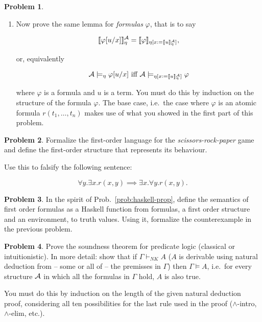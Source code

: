 \documentclass[a4paper]{article}
\theoremstyle{definition}
\newtheorem{prob}{Problem}
\newcommand{\mea}{\llbracket}
\newcommand{\ning}{\rrbracket}
\newcommand{\me}[1]{\mea{#1}\ning}
\begin{document}
\begin{prob}
\begin{enumerate}
\item Now prove the same lemma for {\em formulas} $\varphi$,
      that is to say

      \[\semeta{\varphi[u/x]} = \me{\varphi}_{\eta[x:=\semeta{u}]},\] 

      or, equivalently

      \[ {\cal A} \models_{\eta} \varphi[u/x] \mbox{ iff }
         {\cal A} \models_{\eta[x:=\semeta{u}]} \varphi \]

      where $\varphi$ is a formula and $u$ is a term. You must do this by
      induction on the structure of the formula $\varphi$. The base case,
      i.e.~the case where $\varphi$ is an atomic formula
      $r(t_1,\ldots,t_n)$ makes use of what you showed in the first part
      of this problem. 

\end{enumerate}
\end{prob}


\begin{prob}
Formalize the first-order language for the \emph{scissors-rock-paper}
game and define the first-order structure that represents its
behaviour. 

Use this to falsify the following sentence:

\[ \forall y. \exists x. r(x, y) \implies 
   \exists x. \forall y. r(x, y) . \]
\end{prob}


\begin{prob}
In the spirit of Prob.~{\ref{prob:haskell-prop}}, define the semantics
of first order formulas as a Haskell function from formulas, a first
order structure and an environment, to truth values. Using it,
formalize the counterexample in the previous problem.
\end{prob}


\begin{prob}
Prove the soundness theorem for predicate logic (classical or
intuitionistic). In more detail: show that if $\Gamma \vdash_{NK} A$ 
($A$ is derivable using natural deduction from -- some or all of -- 
the premisses in $\Gamma$) then $\Gamma \models A$, 
i.e.~for every structure ${\cal A}$ in which all the formulas in
$\Gamma$ hold, $A$ is also true.

You must do this by induction on the length of the given natural
deduction proof, considering all ten possibilities for the last rule
used in the proof ($\wedge$-intro, $\wedge$-elim, etc.). 
\end{prob}
\end{document}

